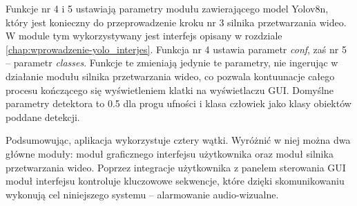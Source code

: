 Funkcje nr 4 i 5 ustawiają parametry modułu zawierającego model Yolov8n, który jest konieczny do przeprowadzenie kroku nr 3 silnika przetwarzania wideo. W module tym wykorzystywany jest interfejs opisany w rozdziale \ref{chap:wprowadzenie-yolo_interjes}. Funkcja nr 4 ustawia parametr \emph{conf}, zaś nr 5 -- parametr \emph{classes}. Funkcje te zmieniają jedynie te parametry, nie ingerując w działanie modułu silnika przetwarzania wideo, co pozwala kontuunacje całego procesu kończącego się wyświetleniem klatki na wyświetlaczu GUI.
Domyślne parametry detektora to 0.5 dla progu ufności i klasa człowiek jako klasy obiektów poddane detekcji.

Podsumowując, aplikacja wykorzystuje cztery wątki. Wyróżnić w niej można dwa główne moduły: moduł graficznego interfejsu użytkownika oraz moduł silnika przetwarzania wideo. Poprzez integracje użytkownika z panelem sterowania GUI moduł interfejsu kontroluje kluczowowe sekwencje, które dzięki skomunikowaniu wykonują cel niniejszego systemu -- alarmowanie audio-wizualne.  